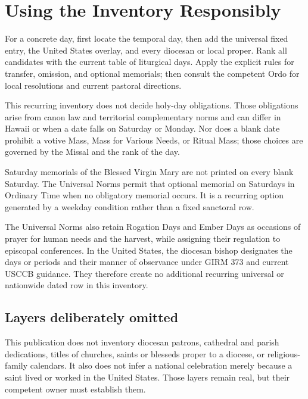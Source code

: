 \section{Using the Inventory Responsibly}

For a concrete day, first locate the temporal day, then add the universal fixed entry, the United States overlay, and every diocesan or local proper. Rank all candidates with the current table of liturgical days. Apply the explicit rules for transfer, omission, and optional memorials; then consult the competent Ordo for local resolutions and current pastoral directions.

This recurring inventory does not decide holy-day obligations. Those obligations arise from canon law and territorial complementary norms and can differ in Hawaii or when a date falls on Saturday or Monday. Nor does a blank date prohibit a votive Mass, Mass for Various Needs, or Ritual Mass; those choices are governed by the Missal and the rank of the day.

Saturday memorials of the Blessed Virgin Mary are not printed on every blank Saturday. The Universal Norms permit that optional memorial on Saturdays in Ordinary Time when no obligatory memorial occurs. It is a recurring option generated by a weekday condition rather than a fixed sanctoral row.

The Universal Norms also retain Rogation Days and Ember Days as occasions of prayer for human needs and the harvest, while assigning their regulation to episcopal conferences. In the United States, the diocesan bishop designates the days or periods and their manner of observance under GIRM 373 and current USCCB guidance. They therefore create no additional recurring universal or nationwide dated row in this inventory.

\subsection{Layers deliberately omitted}

This publication does not inventory diocesan patrons, cathedral and parish dedications, titles of churches, saints or blesseds proper to a diocese, or religious-family calendars. It also does not infer a national celebration merely because a saint lived or worked in the United States. Those layers remain real, but their competent owner must establish them.
